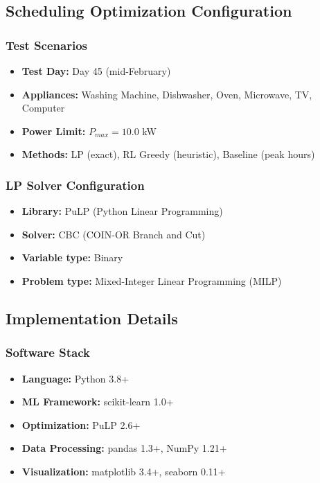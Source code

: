 \documentclass[conference]{IEEEtran}
\begin{document}
\subsection{Scheduling Optimization Configuration}

\subsubsection{Test Scenarios}
\begin{itemize}
    \item \textbf{Test Day:} Day 45 (mid-February)
    \item \textbf{Appliances:} Washing Machine, Dishwasher, Oven, Microwave, TV, Computer
    \item \textbf{Power Limit:} $P_{max} = 10.0$ kW
    \item \textbf{Methods:} LP (exact), RL Greedy (heuristic), Baseline (peak hours)
\end{itemize}

\subsubsection{LP Solver Configuration}
\begin{itemize}
    \item \textbf{Library:} PuLP (Python Linear Programming)
    \item \textbf{Solver:} CBC (COIN-OR Branch and Cut)
    \item \textbf{Variable type:} Binary
    \item \textbf{Problem type:} Mixed-Integer Linear Programming (MILP)
\end{itemize}

\subsection{Implementation Details}

\subsubsection{Software Stack}
\begin{itemize}
    \item \textbf{Language:} Python 3.8+
    \item \textbf{ML Framework:} scikit-learn 1.0+
    \item \textbf{Optimization:} PuLP 2.6+
    \item \textbf{Data Processing:} pandas 1.3+, NumPy 1.21+
    \item \textbf{Visualization:} matplotlib 3.4+, seaborn 0.11+
\end{itemize}
\end{document}
